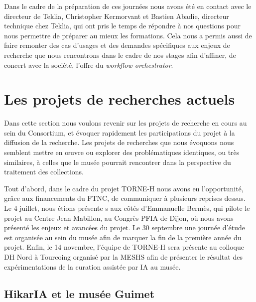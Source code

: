 Dans le cadre de la préparation de ces journées nous avons été en contact avec le directeur de Teklia, Christopher Kermorvant et Bastien Abadie, directeur technique chez Teklia, qui ont pris le temps de répondre à nos questions pour nous permettre de préparer au mieux les formations. Cela nous a permis aussi de faire remonter des cas d'usages et des demandes spécifiques aux enjeux de recherche que nous rencontrons dans le cadre de nos stages afin d'affiner, de concert avec la société, l'offre du \textit{workflow orchestrator}. 

\section{Les projets de recherches actuels}

Dans cette section nous voulons revenir sur les projets de recherche en cours au sein du Consortium, et évoquer rapidement les participations du projet à la diffusion de la recherche. Les projets de recherches que nous évoquons nous semblent mettre en œuvre ou explorer des problématiques identiques, ou très similaires, à celles que le musée pourrait rencontrer dans la perspective du traitement des collections. 

Tout d'abord, dans le cadre du projet TORNE-H nous avons eu l'opportunité, grâce aux financements du FTNC, de communiquer à plusieurs reprises dessus. Le 4 juillet, nous étions présent\wokisme e \wokisme s aux côtés d'Emmanuelle Bermès, qui pilote le projet au Centre Jean Mabillon, au Congrès PFIA de Dijon, où nous avons présenté les enjeux et avancées du projet. Le 30 septembre une journée d'étude est organisée au sein du musée afin de marquer la fin de la première année du projet. Enfin, le 14 novembre, l'équipe de TORNE-H sera présente au colloque DH Nord à Tourcoing organisé par la MESHS afin de présenter le résultat des expérimentations de la curation assistée par IA au musée. 

\subsection{HikarIA et le musée Guimet}

